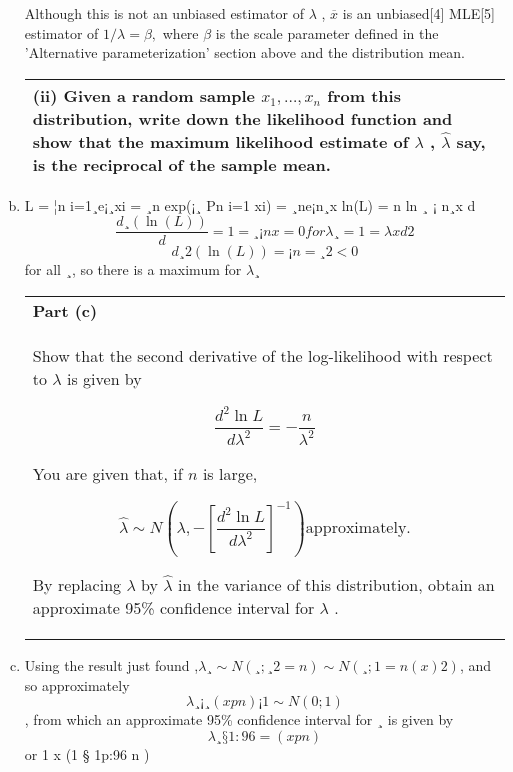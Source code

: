 \documentclass[a4paper,12pt]{article}
\begin{document}
\begin{enumerate}[(a)]
Although this is not an unbiased estimator of 
${\displaystyle \lambda } $
, ${\displaystyle {\overline {x}}}$ 
 is an unbiased[4] MLE[5] estimator of 
${\displaystyle 1/\lambda =\beta ,} $
 where 
${\displaystyle \beta } $
 is the scale parameter defined in the 'Alternative parameterization' section above and the distribution mean. 
  \begin{table}[ht!]
  \centering
  \begin{tabular}{|p{15cm}|}
  \hline 
 (ii) Given a random sample $x_1,\ldots,x_n$ from this distribution, write down the likelihood function and show that the maximum likelihood estimate of $\lambda$ , $\hat{\lambda}$  say, is the reciprocal of the sample mean. 
\\ \hline 
   \end{tabular}
 \end{table}
 \item  L = ¦n i=1¸e¡¸xi = ¸n exp(¡¸
Pn
i=1
xi) = ¸ne¡n¸x ln(L) = n ln ¸ ¡ n¸x
d
\[ \frac{d¸ (\ln(L))}{d} = 1=¸ ¡ nx = 0 for \lambda¸ = 1=\lambda x d2\]
\[d¸2 (\ln(L)) = ¡n=¸2 < 0 \]for all ¸, 
so there is a maximum for $\lambda$¸


 
  \begin{table}[ht!]
  \centering
  \begin{tabular}{|p{15cm}|}
  \hline 
\noindent \textbf{Part (c)} \\Show that the second derivative of the log-likelihood with respect to $\lambda$ is 
given by 
 
\[  \frac{d^2\ln L}{d\lambda^2} = - \frac{n}{\lambda^2} \]
 
  You are given that, if $n$ is large, 
 
 \[ \hat{\lambda} \sim N \left(\lambda , - \left[\frac{d^2\ln L}{d\lambda^2}   \right] ^{-1}   \right) \mbox{approximately}.    \]  
 
  By replacing $\lambda$ by $\hat{\lambda}$  in the variance of this distribution, obtain an approximate 95\% confidence interval for $\lambda$ . 
  
\\ \hline 
   \end{tabular}
 \end{table}
\item  Using the result just found ,$\lambda¸ \sim N(¸; ¸2=n) \sim N(¸; 1=n(x)2)$, and so approximately
\[\lambda¸
¡¸
(x
p
n)¡1 \sim N(0; 1)\], from which an approximate 95\% confidence interval for ¸ is given by
\[\lambda¸
§ 1:96=(x
p
n)\] or 1
x (1 § 1p:96
n )
\end{enumerate}
\end{document}
